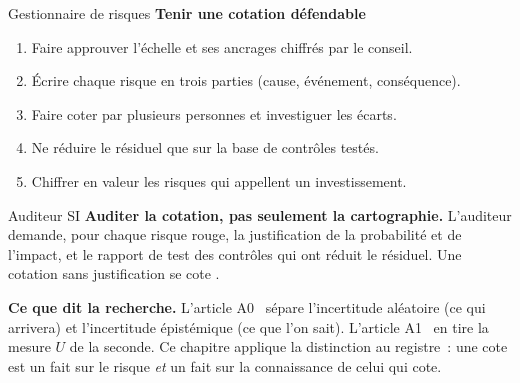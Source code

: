 \begin{boxmetier}{Gestionnaire de risques}
\textbf{Tenir une cotation défendable}
\begin{enumerate}
    \item Faire approuver l'échelle et ses ancrages chiffrés par le conseil.
    \item Écrire chaque risque en trois parties (cause, événement,
          conséquence).
    \item Faire coter par plusieurs personnes et investiguer les écarts.
    \item Ne réduire le résiduel que sur la base de contrôles testés.
    \item Chiffrer en valeur les risques qui appellent un investissement.
\end{enumerate}
\end{boxmetier}

\begin{boxmetier}{Auditeur SI}
\textbf{Auditer la cotation, pas seulement la cartographie.} L'auditeur
demande, pour chaque risque rouge, la justification de la probabilité et de
l'impact, et le rapport de test des contrôles qui ont réduit le résiduel.
Une cotation sans justification se cote \NEK{}.
\end{boxmetier}

\begin{boxinfo}
\textbf{Ce que dit la recherche.} L'article A0~\cite{minka2026auditologie}
sépare l'incertitude aléatoire (ce qui arrivera) et l'incertitude
épistémique (ce que l'on sait). L'article A1~\cite{minka2026nek} en tire
la mesure $U$ de la seconde. Ce chapitre applique la distinction au
registre~: une cote est un fait sur le risque \emph{et} un fait sur la
connaissance de celui qui cote.
\end{boxinfo}

\separateur

